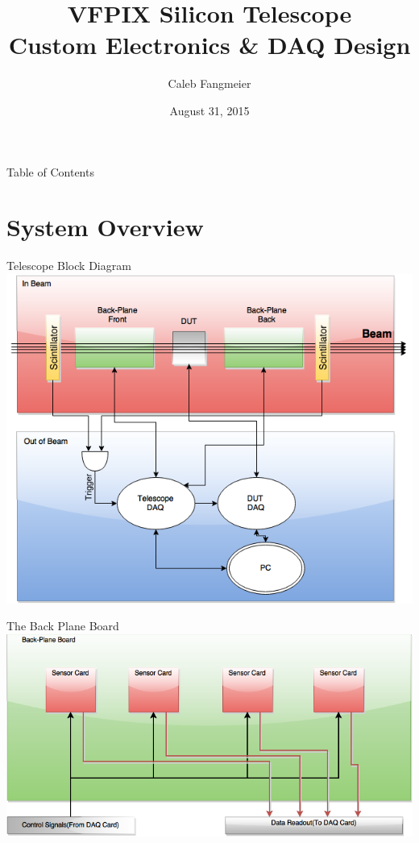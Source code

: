 \documentclass{beamer}
\title{VFPIX Silicon Telescope \\ Custom Electronics \& DAQ Design}
\author[C. Fangmeier]{Caleb Fangmeier}
\institute[UNL]{Univ.\ of Nebraska \-- Lincoln}
\date{August 31, 2015}
\begin{document}
\begin{frame}[plain]
  \titlepage
  \addtocounter{framenumber}{-1}
\end{frame}


\begin{frame}{Table of Contents}
  \tableofcontents
\end{frame}

\section{System Overview}
\begin{frame}{Telescope Block Diagram}
  \centering
  \includegraphics[height=0.8\textheight]{figures/Telescope_Hierarchy}
\end{frame}


\begin{frame}{The Back Plane Board}
  \centering
  \includegraphics[width=1.0\textwidth]{figures/Telescope_BPB}
\end{frame}
\end{document}

